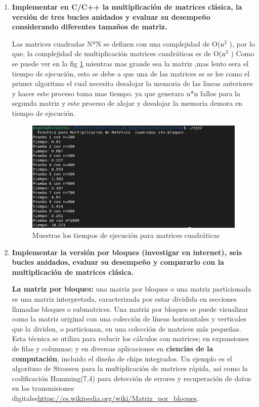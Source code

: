 \documentclass{article}
\begin{document}
\begin{enumerate}
  \item \textbf{Implementar en C/C++ la multiplicación de matrices clásica, la versión de tres
  bucles anidados y evaluar su desempeño considerando diferentes tamaños de matriz.}

  Las matrices cuadradas  N*N \cite{cormen2022introduction}se definen   con una complejidad de O(n$^2$ ), por lo que, la complejidad de multiplicación matrices cuadráticas es de O(n$^3$ )
Como se puede ver en la fig \ref{fig:figura2} mientras mas grande sea la matriz ,mas lento sera el tiempo de ejecución, esto se debe a que una de las matrices se se lee como el primer algoritmo
el cual necesita desalojar la memoria de las lineas anteriores y hacer este proceso toma mas
tiempo. ya que generara n*n fallos para la segunda matriz y este proceso de alojar y desalojar
la memoria demora en tiempo de ejecución.





\begin{figure}[h!]
    \centering
   \includegraphics[width=1\linewidth]{imagenes/Captura de pantalla de 2023-09-24 19-40-19.png}
   \caption{Muestras los tiempos de ejecución para matrices cuadráticas}
   \label{fig:figura2}
\end{figure}


  \item \textbf{Implementar la versión por bloques (investigar en internet), seis bucles anidados, evaluar su desempeño y compararlo con la multiplicación de matrices clásica.}
  
\subitem \textbf{La matriz por bloques:} 
una matriz por bloques o una matriz particionada es una matriz interpretada, caracterizada por estar dividida en secciones llamadas bloques o submatrices. Una matriz por bloques se puede visualizar como la matriz original con una colección de líneas horizontales y verticales que la dividen, o particionan, en una colección de matrices más pequeñas.
  Esta técnica se utiliza para reducir los cálculos con matrices; en expansiones de filas y columnas; y en diversas aplicaciones en \textbf{ciencias de la computación}, incluido el diseño de chips integrados. Un ejemplo es el algoritmo de Strassen para la multiplicación de matrices rápida, así como la codificación Hamming(7,4) para detección de errores y recuperación de datos en las transmisiones digitales\url{https://es.wikipedia.org/wiki/Matriz_por_bloques}.


\end{enumerate}
\end{document}
